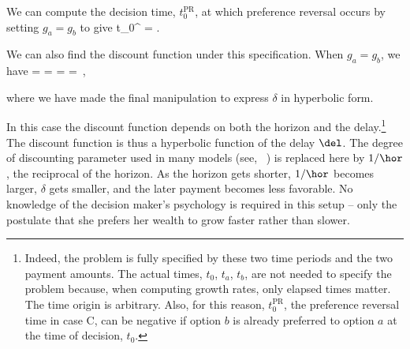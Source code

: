 
We can compute the decision time, $t_0^\text{PR}$, at which preference reversal occurs by setting $g_a=g_b$ to give
\be
t_0^ = .
\ee

We can also find the discount function under this specification. When $g_a=g_b$, we have
\be
\delta =  =  =  = \,,
\ee

where we have made the final manipulation to express $\delta$ in hyperbolic form.

In this case the discount function depends on both the horizon and the delay.\footnote{Indeed, the problem is fully specified by these two time periods and the two payment amounts. The actual times, $t_0$, $t_a$, $t_b$, are not needed to specify the problem because, when computing growth rates, only elapsed times matter. The time origin is arbitrary. Also, for this reason, $t_0^\text{PR}$, the preference reversal time in case C, can be negative if option $b$ is already preferred to option $a$ at the time of decision, $t_0$.} The discount function is thus a hyperbolic function of the delay $\del$. The degree of discounting parameter used in many models (see, \eg~\citet{LoewensteinPrelec1992,Laibson1997}) is replaced here by $1/\hor$, the reciprocal of the horizon. As the horizon gets shorter, $1/\hor$ becomes larger, $\delta$ gets smaller, and the later payment becomes less favorable. No knowledge of the decision maker's psychology is required in this setup -- only the postulate that she prefers her wealth to grow faster rather than slower.

